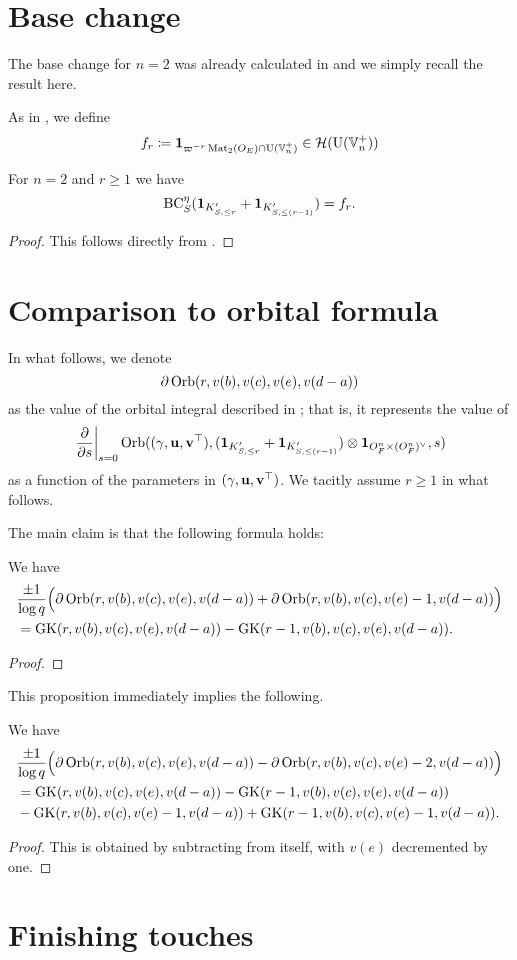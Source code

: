 \section{Base change}
The base change for $n=2$ was already calculated in \cite{ref:AFLspherical}
and we simply recall the result here.

As in , we define
\[ f_r \coloneqq \mathbf{1}_{\varpi^{-r} \operatorname{Mat}_2(O_E) \cap \operatorname{U}(\mathbb V_n^+)} \in \mathcal H(\operatorname{U}(\mathbb V_n^+)) \]
\begin{lemma}
  For $n = 2$ and $r \ge 1$ we have
  \[
    \operatorname{BC}_S^{\eta}(
      \mathbf{1}_{K'_{S, \le r}}
      + \mathbf{1}_{K'_{S, \le (r-1)}}
    ) = f_r.
  \]
\end{lemma}
\begin{proof}
  This follows directly from \cite[equation (7.1.9)]{ref:AFLspherical}.
\end{proof}

\section{Comparison to orbital formula}
In what follows, we denote
\[ \partial\operatorname{Orb}(r, v(b), v(c), v(e), v(d-a)) \]
as the value of the orbital integral described in ; that is,
it represents the value of
\[ \left. \pdv{}{s} \right\rvert_{s=0}
  \operatorname{Orb}({(\gamma, \mathbf u, \mathbf v^\top)}, (\mathbf{1}_{K'_{S, \le r}} + \mathbf{1}_{K'_{S, \le (r-1)}}) \otimes \mathbf{1}_{O_F^n \times (O_F^n)^\vee}, s) \]
as a function of the parameters in ${(\gamma, \mathbf u, \mathbf v^\top)}$.
We tacitly assume $r \ge 1$ in what follows.

The main claim is that the following formula holds:
\begin{proposition}
  \label{prop:finale_by_one}
  We have
  \begin{align*}
    &\frac{\pm1}{\log q}\Big(\partial\operatorname{Orb}(r, v(b), v(c), v(e), v(d-a))
      + \partial\operatorname{Orb}(r, v(b), v(c), v(e)-1, v(d-a))\Big) \\
    &= \operatorname{GK}(r, v(b), v(c), v(e), v(d-a)) - \operatorname{GK}(r-1, v(b), v(c), v(e), v(d-a)).
  \end{align*}
\end{proposition}
\begin{proof}
\end{proof}

This proposition immediately implies the following.
\begin{corollary}
  \label{cor:finale_by_two}
  We have
  \begin{align*}
    &\frac{\pm1}{\log q}\Big(\partial\operatorname{Orb}(r, v(b), v(c), v(e), v(d-a)) - \partial\operatorname{Orb}(r, v(b), v(c), v(e)-2, v(d-a))\Big) \\
    &= \operatorname{GK}(r, v(b), v(c), v(e), v(d-a)) - \operatorname{GK}(r-1, v(b), v(c), v(e), v(d-a)) \\
    &- \operatorname{GK}(r, v(b), v(c), v(e)-1, v(d-a)) + \operatorname{GK}(r-1, v(b), v(c), v(e)-1, v(d-a)).
  \end{align*}
\end{corollary}
\begin{proof}
  This is obtained by subtracting  from itself,
  with $v(e)$ decremented by one.
\end{proof}

\section{Finishing touches}
